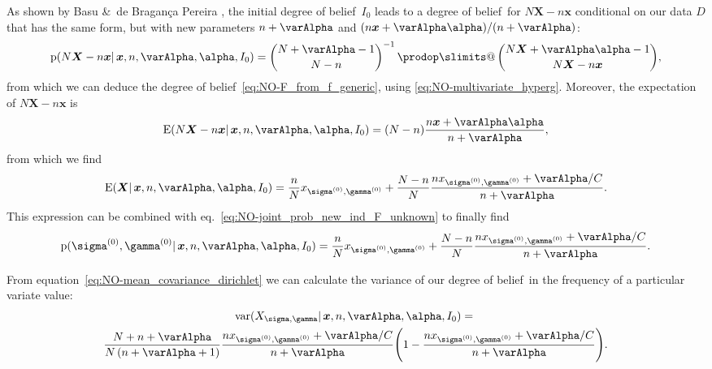 \documentclass[\ifafour a4paper,12pt,\else a5paper,10pt,\fi%
onecolumn,oneside,article,%
british%
]{memoir}
\makeatletter
\theoremstyle{remark}
\theoremstyle{innote}
\def\prod{\DOTSI\prodop\slimits@}
\newcommand*{\citey}{\parencites*}
\newcommand*{\amp}{\&}
\newcommand*{\pf}{\mathrm{p}}%
\renewcommand*{\|}{\mathpunct{|}}
\newcommand*{\sect}{\S}%
\newcommand*{\eqn}{eq.}%
\newcommand*{\tprod}{\mathop{\textstyle\prod}\nolimits}
\newcommand*{\E}{\mathrm{E}}
\DeclareMathOperator{\var}{var}
\newcommand*{\dob}{degree of belief}
\newcommand*{\yD}{D}
\newcommand*{\yprod}{\tprod}
\newcommand*{\ys}{\sigma}
\newcommand*{\yg}{\gamma}
\newcommand*{\ysi}[1]{\ys^{(#1)}}
\newcommand*{\ygi}[1]{\yg^{(#1)}}
\newcommand*{\yso}{\ysi{0}}
\newcommand*{\ygo}{\ygi{0}}
\newcommand*{\yF}{\bm{X}}
\newcommand*{\yf}{\bm{x}}
\newcommand*{\yIo}{I_{0}}
\newcommand*{\yA}{\varAlpha}
\newcommand*{\ya}{\bm{\alpha}}
\makeatother
\begin{document}

As shown by Basu \amp\ de Bragan\c{c}a Pereira \citey[\sect~4,
Theorem~2]{basuetal1982}, the initial \dob\ $\yIo$ leads to a \dob\ for
$N\yF-n\yf$ conditional on our data $\yD$ that has the same form, but with
new parameters $n+\yA$ and $(n\yf+\yA\ya)/(n+\yA)$:
\begin{equation}
  \label{eq:NO-dirichlet_posterior_X}
  \pf(N\yF -n\yf \| \yf, n, \yA, \ya,\yIo) =
  \binom{N+\yA-1}{N-n}^{-1} \yprod\binom{N\yF+\yA\ya-1}{N\yF-n\yf},
\end{equation}
from which we can deduce the \dob~\eqref{eq:NO-F_from_f_generic}, using
\eqref{eq:NO-multivariate_hyperg}. Moreover, the expectation of $N\yF-n\yf$ is
\citey[\sect~3]{basuetal1982}
\begin{equation}
  \label{eq:NO-dirichlet_posterior_expectation}
  \E(N\yF -n\yf \| \yf, n, \yA, \ya,\yIo) =
  (N-n) \frac{n\yf+\yA\ya}{n+\yA},
\end{equation}
from which we find
\begin{equation}
    \label{eq:NO-expect_freq_dirichlet_prior_final}
    \E(\yF \| \yf, n,\yA,\ya, \yIo)  =
    \frac{n}{N}x_{\yso, \ygo} + \frac{N-n}{N}
\frac{n x_{\yso, \ygo}+\yA/C}{n+\yA}.
\end{equation}
This expression can be combined with
\eqn~\eqref{eq:NO-joint_prob_new_ind_F_unknown} to finally find
\begin{equation}
    \label{eq:NO-joint_prob_new_ind_full_dirichlet_prior_final}
    \pf(\yso, \ygo \| \yf, n,\yA,\ya, \yIo)  =
    \frac{n}{N}x_{\yso, \ygo} + \frac{N-n}{N}
\frac{n x_{\yso, \ygo}+\yA/C}{n+\yA}.
\end{equation}

From equation~\eqref{eq:NO-mean_covariance_dirichlet} we can calculate the
variance of our \dob\ in the frequency of a particular variate value:
\begin{multline}
  \label{eq:NO-variance_single_gene_dirichlet}
  \var(X_{\ys,\yg} \| \yf, n,\yA,\ya, \yIo)  ={}\\
  \frac{N+n+\yA}{N\,(n+\yA+1)}
  \frac{n x_{\yso, \ygo}+\yA/C}{n+\yA}
  \Biggl(1- \frac{n x_{\yso, \ygo}+\yA/C}{n+\yA} \Biggr).
\end{multline}
\end{document}
